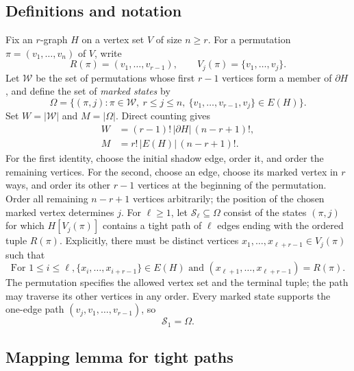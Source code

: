 \documentclass[11pt]{article}
\theoremstyle{remark}
\numberwithin{equation}{section}
\newcommand{\sh}{\partial}
\newcommand{\Wcal}{\mathcal W}
\newcommand{\Scal}{\mathcal S}
\begin{document}
	\subsection{Definitions and notation} \label{subsection:defns} Fix an $r$-graph $H$ on a vertex set $V$ of size $n\ge r$.
	For a permutation $\pi=(v_1,\ldots,v_n)$ of $V$, write
	\[
	R(\pi)=(v_1,\ldots,v_{r-1}),\qquad
	V_j(\pi)=\{v_1,\ldots,v_j\}.
	\]
	Let $\Wcal$ be the set of permutations whose first $r-1$ vertices
	form a member of $\sh H$, and define the set of \emph{marked states}
	by
	\begin{equation}\label{eq:states}
		\Omega=\bigl\{(\pi,j):\pi\in\Wcal,\ r\le j\le n,
		\ \{v_1,\ldots,v_{r-1},v_j\}\in E(H)\bigr\}.
	\end{equation}
	Set $W=|\Wcal|$ and $M=|\Omega|$. Direct counting gives
	\begin{equation}\label{eq:counts}
		\begin{aligned}
			W&=(r-1)!\,|\sh H|\,(n-r+1)!,\\
			M&=r!\,|E(H)|\,(n-r+1)!.
		\end{aligned}
	\end{equation}
	For the first identity, choose the initial shadow edge, order it,
	and order the remaining vertices. For the second, choose an edge,
	choose its marked vertex in $r$ ways, and order its other $r-1$
	vertices at the beginning of the permutation. Order all remaining
	$n-r+1$ vertices arbitrarily; the position of the chosen marked
	vertex determines $j$. For $\ell\ge1$, let $\Scal_\ell\subseteq\Omega$ consist of the
	states $(\pi,j)$ for which $H[V_j(\pi)]$ contains a tight path of
	$\ell$ edges ending with the ordered tuple $R(\pi)$. Explicitly,
	there must be distinct vertices $x_1,\ldots,x_{\ell+r-1}\in V_j(\pi)$
	such that
	\begin{equation}\label{eq:path-state}
		\mbox{For }1 \leq i \leq \ell, 
		\{x_i,\ldots,x_{i+r-1}\} \in E(H)\mbox{ and }
		(x_{\ell+1},\ldots,x_{\ell+r-1}) = R(\pi).
	\end{equation}
	The permutation specifies the allowed vertex set and the terminal
	tuple; the path may traverse its other vertices in any order.
	Every marked state supports the one-edge path
	$(v_j,v_1,\ldots,v_{r-1})$, so
	\begin{equation}\label{eq:path-base}
		\Scal_1=\Omega.
	\end{equation}
	
	\subsection{Mapping lemma for tight paths}
	
\end{document}
